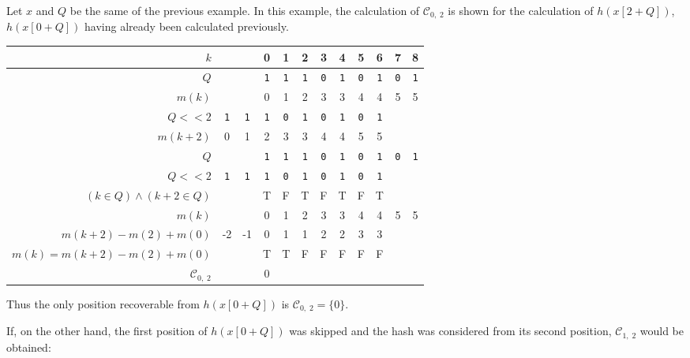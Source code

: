 \begin{example}
	Let $x$ and $Q$ be the same of the previous example. In this example, the calculation of $\mathcal{C}_{0,\; 2}$ is shown for the calculation of $h(x[2 + Q])$, $h(x[0 + Q])$ having already been calculated previously.
	
	\begin{center}
		\begin{tabular}{r || cc|ccccccc|cc}
			$k$ & & & 0 & 1 & 2 & 3 & 4 & 5 & 6 & 7 & 8 \\
			\midrule
			$Q$ & & & \texttt{1} & \texttt{1} & \texttt{1} & \texttt{0} & \texttt{1} & \texttt{0} & \texttt{1} & \texttt{0} & \texttt{1} \\
			$m(k)$ & & & 0 & 1 & 2 & 3 & 3 & 4 & 4 & 5 & 5 \\
			\midrule
			$Q <\!< 2$ & \texttt{1} & \texttt{1} & \texttt{1} & \texttt{0} & \texttt{1} & \texttt{0} & \texttt{1} & \texttt{0} & \texttt{1} & & \\
			$m(k + 2)$ & 0 & 1 & 2 & 3 & 3 & 4 & 4 & 5 & 5 & & \\
			\midrule
			$Q$ & & & \texttt{1} & \texttt{1} & \texttt{1} & \texttt{0} & \texttt{1} & \texttt{0} & \texttt{1} & \texttt{0} & \texttt{1} \\
			$Q <\!< 2$ & \texttt{1} & \texttt{1} & \texttt{1} & \texttt{0} & \texttt{1} & \texttt{0} & \texttt{1} & \texttt{0} & \texttt{1} & & \\
			$(k \in Q) \wedge (k + 2 \in Q)$ & & & T & F & T & F & T & F & T & & \\
			\midrule
			$m(k)$ & & & 0 & 1 & 2 & 3 & 3 & 4 & 4 & 5 & 5 \\
			$m(k + 2) - m(2) + m(0)$ & -2 & -1 & 0 & 1 & 1 & 2 & 2 & 3 & 3 & & \\
			$m(k) = m(k + 2) - m(2) + m(0)$ & & & T & T & F & F & F & F & F & & \\
			\midrule
			$\mathcal{C}_{0,\; 2}$ & & & 0 & & & & & & & & \\
		\end{tabular}
	\end{center}
	
	Thus the only position recoverable from $h(x[0 + Q])$ is $\mathcal{C}_{0,\; 2} = \{ 0 \}$.
	
	If, on the other hand, the first position of $h(x[0 + Q])$ was skipped and the hash was considered from its second position, $\mathcal{C}_{1,\; 2}$ would be obtained:
	

\end{example}
